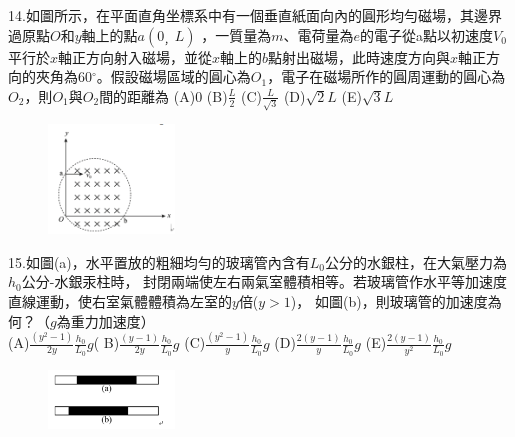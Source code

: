 \documentclass[cn,10pt,math=newtx,chinesefont=founder,device=ig]{elegantbook}
\begin{document}
\begin{example}
   14.如圖所示，在平面直角坐標系中有一個垂直紙面向內的圓形均勻磁場，其邊界過原點$O$和$y$軸上的點$a(0_，L)$ ，一質量為$m$、電荷量為$e$的電子從a點以初速度$V_0$平行於$x$軸正方向射入磁場，並從$x$軸上的$b$點射出磁場，此時速度方向與$x$軸正方向的夾角為60$^\circ$。假設磁場區域的圓心為$O_1$，電子在磁場所作的圓周運動的圓心為$O_2$，則$O_1$與$O_2$間的距離為
   (A)0 (B)$\frac{L}{2}$ (C)$\frac{L}{\sqrt{3}}$ (D)$\sqrt{2} L$ (E)$\sqrt{3} L$
   \\
    \rightline{[成德高中教甄109]}
\end{example}
\begin{solution}
    
\end{solution}
\begin{figure}[htbp]
    \flushright
    \includegraphics[width=0.3\textwidth]{image/109成德14.png}
  \end{figure}
\newpage


\begin{example}
   15.如圖(a)，水平置放的粗細均勻的玻璃管內含有$L_0$公分的水銀柱，在大氣壓力為$h_0$公分-水銀汞柱時，
   封閉兩端使左右兩氣室體積相等。若玻璃管作水平等加速度直線運動，使右室氣體體積為左室的$y$倍($y>1$)，
   如圖(b)，則玻璃管的加速度為何？（$g$為重力加速度）\\
   (A)$\frac{(y^2 -1)}{2y} \frac{h_0}{L_0} g$( B)$\frac{(y -1)}{2y} \frac{h_0}{L_0} g$ 
   (C)$\frac{(y^2 -1)}{y} \frac{h_0}{L_0} g$ (D)$\frac{2(y -1)}{y} \frac{h_0}{L_0} g$ 
   (E)$\frac{2(y -1)}{y^2} \frac{h_0}{L_0} g$
   \\
    \rightline{[成德高中教甄109]}
\end{example}
\begin{solution}
    
\end{solution}
\begin{figure}[htbp]
    \flushright
    \includegraphics[width=0.3\textwidth]{image/109成德15.png}
  \end{figure}
\newpage
\end{document}
